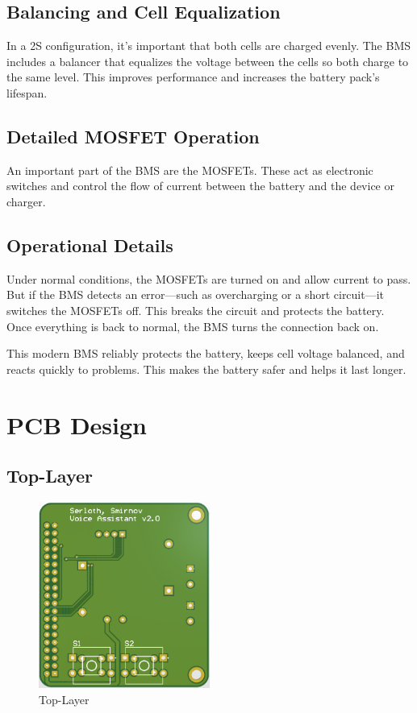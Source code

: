 \subsection*{Balancing and Cell Equalization}
In a 2S configuration, it's important that both cells are charged evenly. The BMS includes a balancer that equalizes the voltage between the cells so both charge to the same level. This improves performance and increases the battery pack’s lifespan.

\subsection*{Detailed MOSFET Operation}
An important part of the BMS are the MOSFETs. These act as electronic switches and control the flow of current between the battery and the device or charger.

\subsection*{Operational Details}
Under normal conditions, the MOSFETs are turned on and allow current to pass. But if the BMS detects an error—such as overcharging or a short circuit—it switches the MOSFETs off. This breaks the circuit and protects the battery. Once everything is back to normal, the BMS turns the connection back on.

This modern BMS reliably protects the battery, keeps cell voltage balanced, and reacts quickly to problems. This makes the battery safer and helps it last longer.

\newpage

\section{PCB Design}

\subsection{Top-Layer}

\begin{figure}[ht]
    \centering
    \includegraphics[width=0.5\textwidth]{assets/TopLayer}
    \caption{Top-Layer}
    \label{fig:top-layer}
\end{figure}

